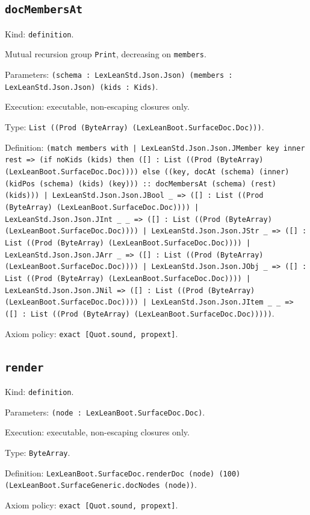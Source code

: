 \documentclass[11pt]{article}
\begin{document}
\subsection*{\texttt{docMembersAt}}
\noindent Kind: \texttt{definition}.\par
\noindent Mutual recursion group \texttt{Print}, decreasing on \texttt{members}.\par
\noindent Parameters: \texttt{(schema : LexLeanStd.Json.Json) (members : LexLeanStd.Json.Json) (kids : Kids)}.\par
\noindent Execution: executable, non-escaping closures only.\par
\noindent Type: \texttt{List ((Prod (ByteArray) (LexLeanBoot.SurfaceDoc.Doc)))}.\par
\noindent Definition: \texttt{(match members with | LexLeanStd.Json.Json.JMember key inner rest => (if noKids (kids) then ([] : List ((Prod (ByteArray) (LexLeanBoot.SurfaceDoc.Doc)))) else ((key, docAt (schema) (inner) (kidPos (schema) (kids) (key))) :: docMembersAt (schema) (rest) (kids))) | LexLeanStd.Json.Json.JBool \_ => ([] : List ((Prod (ByteArray) (LexLeanBoot.SurfaceDoc.Doc)))) | LexLeanStd.Json.Json.JInt \_ \_ => ([] : List ((Prod (ByteArray) (LexLeanBoot.SurfaceDoc.Doc)))) | LexLeanStd.Json.Json.JStr \_ => ([] : List ((Prod (ByteArray) (LexLeanBoot.SurfaceDoc.Doc)))) | LexLeanStd.Json.Json.JArr \_ => ([] : List ((Prod (ByteArray) (LexLeanBoot.SurfaceDoc.Doc)))) | LexLeanStd.Json.Json.JObj \_ => ([] : List ((Prod (ByteArray) (LexLeanBoot.SurfaceDoc.Doc)))) | LexLeanStd.Json.Json.JNil => ([] : List ((Prod (ByteArray) (LexLeanBoot.SurfaceDoc.Doc)))) | LexLeanStd.Json.Json.JItem \_ \_ => ([] : List ((Prod (ByteArray) (LexLeanBoot.SurfaceDoc.Doc)))))}.\par
\noindent Axiom policy: \texttt{exact [Quot.sound, propext]}.\par
\subsection*{\texttt{render}}
\noindent Kind: \texttt{definition}.\par
\noindent Parameters: \texttt{(node : LexLeanBoot.SurfaceDoc.Doc)}.\par
\noindent Execution: executable, non-escaping closures only.\par
\noindent Type: \texttt{ByteArray}.\par
\noindent Definition: \texttt{LexLeanBoot.SurfaceDoc.renderDoc (node) (100) (LexLeanBoot.SurfaceGeneric.docNodes (node))}.\par
\noindent Axiom policy: \texttt{exact [Quot.sound, propext]}.\par
\end{document}
